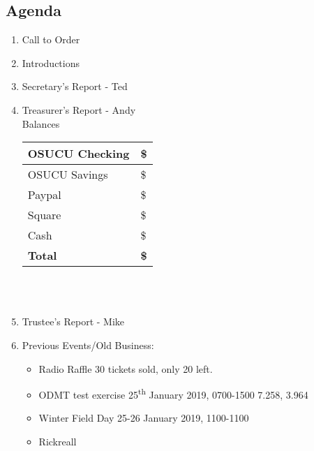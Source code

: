 \documentclass[letter,11pt]{extarticle}
\begin{document}
	\subsection*{Agenda}
	\begin{enumerate}
		\item Call to Order
		\item Introductions
		\item Secretary's Report - Ted
		\item Treasurer's Report - Andy \\
				Balances 
			\begin{tabular}{|l|l|} \hline
				OSUCU Checking & \$ \\ \hline
				OSUCU Savings & \$ \\ \hline
				Paypal & \$ \\ \hline
				Square & \$ \\ \hline
				Cash & \$ \\ \hline
				\textbf{Total} & \textbf{\$} \\ \hline
			\end{tabular} \\ \\
		\item Trustee's Report - Mike
		\item Previous Events/Old Business:
		\begin{itemize}
				\item Radio Raffle 30 tickets sold, only 20 left.
				\item ODMT test exercise 25\textsuperscript{th} January 2019, 0700-1500 7.258, 3.964
				\item Winter Field Day 25-26 January 2019, 1100-1100
				\item Rickreall
		\end{itemize}
			

\end{enumerate}
\end{document}

